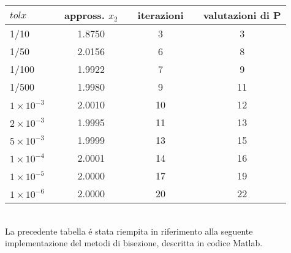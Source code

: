 \begin{tabular}{l*{6}{c}}
 \(tolx\) &\vline& appross. \(x_2\) &\vline& iterazioni &\vline& valutazioni di P\\
\hline
 1/10 &\vline& 1.8750 &\vline& 3 &\vline& 3\\
 1/50 &\vline& 2.0156 &\vline& 6 &\vline& 8\\
 1/100 &\vline& 1.9922 &\vline& 7 &\vline& 9\\
 1/500 &\vline& 1.9980 &\vline& 9 &\vline& 11\\
 \(1 \times 10^{-3}\) &\vline& 2.0010 &\vline& 10 &\vline& 12\\
 \(2 \times 10^{-3}\) &\vline& 1.9995 &\vline& 11 &\vline& 13\\
 \(5 \times 10^{-3}\) &\vline& 1.9999 &\vline& 13 &\vline& 15\\
 \(1 \times 10^{-4}\) &\vline& 2.0001 &\vline& 14 &\vline& 16\\
 \(1 \times 10^{-5}\) &\vline& 2.0000 &\vline& 17 &\vline& 19\\
 \(1 \times 10^{-6}\) &\vline& 2.0000 &\vline& 20 &\vline& 22\\
\end{tabular} \\

\noindent La precedente tabella \'e stata riempita in riferimento alla seguente implementazione del metodi di bisezione, descritta in codice Matlab.\\


